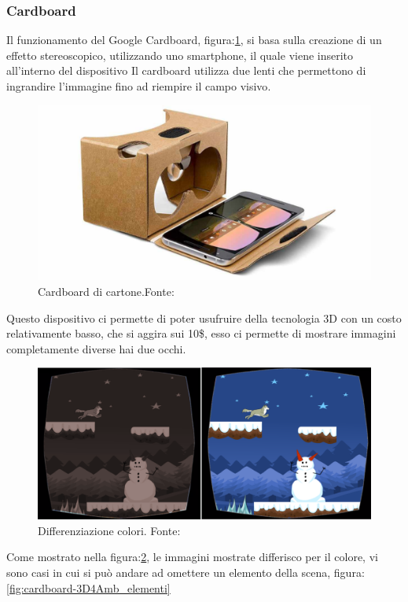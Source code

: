 \documentclass[
a4paper,
cleardoublepage=empty,
headings=twolinechapter,
numbers=autoenddot,
]{scrbook}
\begin{document}
	\subsubsection{Cardboard}\label{chap:cardboard}
    Il funzionamento del Google Cardboard, figura:\ref{fig:cardboard}, si basa sulla creazione di un effetto stereoscopico\cite{Stereoscopio}, utilizzando uno smartphone, il quale viene inserito all'interno del dispositivo
	Il cardboard utilizza due lenti che permettono di ingrandire l'immagine fino ad riempire il campo visivo\cite{Funzionamento_cardboard}.
	\begin{figure}[H]
		\centering
		\includegraphics[width=0.8\linewidth]{image/cardboard}
		\caption{Cardboard di cartone.Fonte:\cite{Cardboard_image}}
		\label{fig:cardboard}
	\end{figure}
	Questo dispositivo ci permette di poter usufruire della tecnologia 3D con un costo relativamente basso, che si aggira sui 10\$, esso ci permette di mostrare immagini completamente diverse hai due occhi.
	\begin{figure}[H]
		\centering
		\includegraphics[width=0.8\linewidth]{image/3D4Amb_1}
		\caption{Differenziazione colori.
			Fonte:\cite{3d4amb}}
		\label{fig:cardboard-3D4Amb_colori}
	\end{figure}
    Come mostrato nella figura:\ref{fig:cardboard-3D4Amb_colori}, le immagini mostrate differisco per il colore, vi sono casi in cui si può andare ad omettere un elemento della scena, figura:\ref{fig:cardboard-3D4Amb_elementi}
\end{document}
